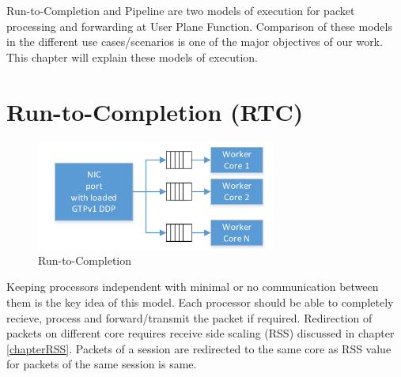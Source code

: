 Run-to-Completion and Pipeline are two models of execution for packet processing and forwarding at User Plane Function.
Comparison of these models in the different use cases/scenarios is one of the major objectives of our work. This chapter will explain these models of execution.

\section{Run-to-Completion (RTC) \label{secRTC} }
 \begin{figure}[htbp]
    \centering
    \includegraphics[width=0.7\textwidth, keepaspectratio]{./fig/ModelsofExecution/RTC.png}
    \caption{Run-to-Completion}
    \label{figRTC}
    \end{figure}
Keeping processors independent with minimal or no communication between them is the key idea of this model. Each
 processor should be able to completely recieve, process and forward/transmit the packet if required. Redirection of packets on different core requires receive side scaling (RSS) discussed in chapter \ref{chapterRSS}. Packets of a session are redirected to the same core as RSS value for packets of the same session is same.
